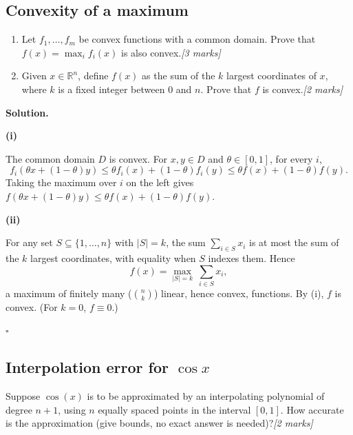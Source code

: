 \documentclass[11pt,a4paper]{article}
\newenvironment{solution}
  {\par\noindent\textbf{Solution.}\par\nobreak}
  {\par\hfill\(\square\)\par}
\newcommand{\step}[1]{\par\addvspace{0.5em}\noindent\textbf{#1}\par\nobreak}
\newcommand{\mk}[1]{\hfill\textit{[#1 marks]}}
\begin{document}
\subsection{Convexity of a maximum}

\begin{qbox}
\begin{enumerate}[label=(\roman*)]
  \item Let \(f_1,\dots,f_m\) be convex functions with a common domain.
    Prove that \(f(x)=\max_{i}f_i(x)\) is also convex.\mk{3}
  \item Given \(x\in\mathbb R^n\), define \(f(x)\) as the sum of the
    \(k\) largest coordinates of \(x\), where \(k\) is a fixed integer
    between \(0\) and \(n\).  Prove that \(f\) is convex.\mk{2}
\end{enumerate}
\end{qbox}

\begin{solution}
\step{(i)}
The common domain \(D\) is convex.  For \(x,y\in D\) and
\(\theta\in[0,1]\), for every \(i\),
\[
  f_i(\theta x+(1-\theta)y)\le\theta f_i(x)+(1-\theta)f_i(y)
  \le\theta f(x)+(1-\theta)f(y).
\]
Taking the maximum over \(i\) on the left gives
\(f(\theta x+(1-\theta)y)\le\theta f(x)+(1-\theta)f(y)\).

\step{(ii)}
For any set \(S\subseteq\{1,\dots,n\}\) with \(|S|=k\), the sum
\(\sum_{i\in S}x_i\) is at most the sum of the \(k\) largest
coordinates, with equality when \(S\) indexes them.  Hence
\[
  f(x)=\max_{|S|=k}\ \sum_{i\in S}x_i ,
\]
a maximum of finitely many (\(\binom nk\)) linear, hence convex,
functions.  By (i), \(f\) is convex.  (For \(k=0\), \(f\equiv0\).)
\end{solution}

\subsection{Interpolation error for \(\cos x\)}

\begin{qbox}
Suppose \(\cos(x)\) is to be approximated by an interpolating
polynomial of degree \(n+1\), using \(n\) equally spaced points in the
interval \([0,1]\).  How accurate is the approximation (give bounds, no
exact answer is needed)?\mk{2}
\end{qbox}
\end{document}
